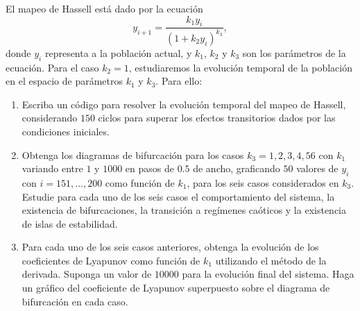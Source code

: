\documentclass[a4paper,12pt]{article}
\begin{document}
\begin{enumerate}
    El mapeo de Hassell está dado por la ecuación 
    \[ y_{i+1} = \frac{k_1 y_i}{\left ( 1 + k_2 y_i \right )^{k_3}}, \]
    donde $y_i$ representa a la población actual, y $k_1$, $k_2$ y $k_3$ son
    los parámetros de la ecuación.
    Para el caso $k_2=1$, estudiaremos la evolución temporal de la población en el espacio de parámetros $k_1$ y $k_3$. Para ello: 

    \begin{enumerate}
      \item Escriba un código para resolver la evolución temporal del mapeo de
        Hassell, considerando $150$ ciclos para superar los efectos
        transitorios dados por las condiciones iniciales.
      \item Obtenga los diagramas de bifurcación para los casos $k_3=1,2,3,4,5
        6$ con $k_1$ variando entre $1$ y $1000$ en pasos de $0.5$ de ancho,
        graficando $50$ valores de $y_i$ con $i=151,\ldots,200$ como función de
        $k_1$, para los seis casos considerados en $k_3$. Estudie para cada uno
        de los seis casos el comportamiento del sistema, la existencia de
        bifurcaciones, la transición a regímenes caóticos y la existencia de
        islas de estabilidad. 
      \item Para cada uno de los seis casos anteriores, obtenga la evolución de
        los coeficientes de Lyapunov como función de $k_1$ utilizando el método
        de la derivada. Suponga un valor de $10000$ para la evolución final del
        sistema. Haga un gráfico del coeficiente de Lyapunov superpuesto sobre
        el diagrama de bifurcación en cada caso. 
    \end{enumerate}
\end{enumerate}
\end{document}

